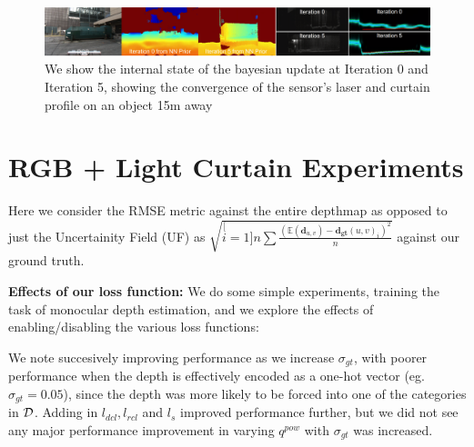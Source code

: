 \begin{figure}[h!]
   \includegraphics[width=1.0\textwidth]{figures/p6.png}
   \caption{We show the internal state of the bayesian update at Iteration 0 and Iteration 5, showing the convergence of the sensor's laser and curtain profile on an object 15m away}  
   \label{fig:images4} 
\end{figure}

\section{RGB + Light Curtain Experiments} 

Here we consider the RMSE metric against the entire depthmap as opposed to just the Uncertainity Field (UF) as $\sqrt{\stackrel[i=1]{n}{\sum}\frac{\left(\mathbb{E}\left(\mathbf{d}_{u,v}\right)-\mathbf{d_{gt}}(u,v)_{i}\right)^{2}}{n}}$ against our ground truth.

\textbf{Effects of our loss function:} We do some simple experiments, training the task of monocular depth estimation, and we explore the effects of enabling/disabling the various loss functions:
\noindent
\begin{table}[h]
   \centering
   \caption{Effects of Soft Cross Entropy ($\sigma_{gt}$), Left/Right Consistency ($l_{dcl}, l_{rcl}$), Smoothness losses ()$l_{s}$) for the baseline of Monocular Depth Estimation only}
   \label{table:xx}
\end{table}

We note succesively improving performance as we increase $\sigma_{gt}$, with poorer performance when the depth is effectively encoded as a one-hot vector (eg. $\sigma_{gt}=0.05$), since the depth was more likely to be forced into one of the categories in $\mathcal{D}$. Adding in $l_{dcl}, l_{rcl}$ and $l_{s}$ improved performance further, but we did not see any major performance improvement in varying $q^{pow}$ with $\sigma_{gt}$ was increased.

